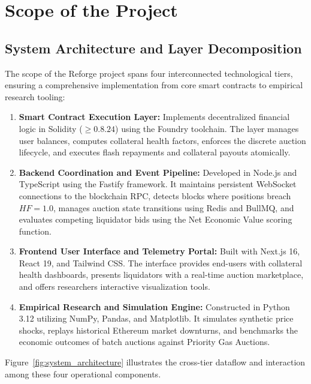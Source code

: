 \chapter{Scope of the Project}
\label{chap:scope}

\section{System Architecture and Layer Decomposition}
The scope of the Reforge project spans four interconnected technological tiers, ensuring a comprehensive implementation from core smart contracts to empirical research tooling:

\begin{enumerate}
    \item \textbf{Smart Contract Execution Layer:}
    Implements decentralized financial logic in Solidity ($\ge 0.8.24$) using the Foundry toolchain. The layer manages user balances, computes collateral health factors, enforces the discrete auction lifecycle, and executes flash repayments and collateral payouts atomically.
    
    \item \textbf{Backend Coordination and Event Pipeline:}
    Developed in Node.js and TypeScript using the Fastify framework. It maintains persistent WebSocket connections to the blockchain RPC, detects blocks where positions breach $HF = 1.0$, manages auction state transitions using Redis and BullMQ, and evaluates competing liquidator bids using the Net Economic Value scoring function.
    
    \item \textbf{Frontend User Interface and Telemetry Portal:}
    Built with Next.js 16, React 19, and Tailwind CSS. The interface provides end-users with collateral health dashboards, presents liquidators with a real-time auction marketplace, and offers researchers interactive visualization tools.
    
    \item \textbf{Empirical Research and Simulation Engine:}
    Constructed in Python 3.12 utilizing NumPy, Pandas, and Matplotlib. It simulates synthetic price shocks, replays historical Ethereum market downturns, and benchmarks the economic outcomes of batch auctions against Priority Gas Auctions.
\end{enumerate}

Figure~\ref{fig:system_architecture} illustrates the cross-tier dataflow and interaction among these four operational components.

